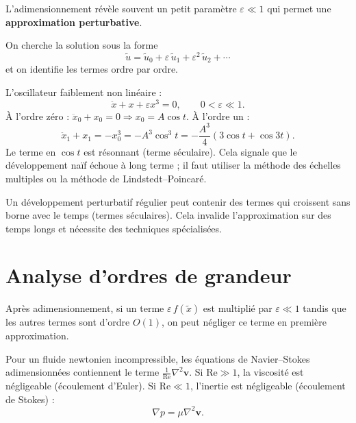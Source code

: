 L'adimensionnement r\'ev\`ele souvent un petit param\`etre $\varepsilon\ll 1$
qui permet une \textbf{approximation perturbative}.

\begin{definition}
On cherche la solution sous la forme
\[
  \tilde{u} = \tilde{u}_0 + \varepsilon\,\tilde{u}_1
             + \varepsilon^2\,\tilde{u}_2 + \cdots
\]
et on identifie les termes ordre par ordre.
\end{definition}

\begin{exemple}
L'oscillateur faiblement non lin\'eaire :
\[
  \ddot{x} + x + \varepsilon x^3 = 0, \qquad 0<\varepsilon\ll 1.
\]
\`A l'ordre z\'ero : $\ddot{x}_0 + x_0 = 0 \Rightarrow x_0 = A\cos t$.
\`A l'ordre un :
\[
  \ddot{x}_1 + x_1 = -x_0^3 = -A^3\cos^3 t
  = -\frac{A^3}{4}(3\cos t + \cos 3t).
\]
Le terme en $\cos t$ est r\'esonnant (terme s\'eculaire).  Cela
signale que le d\'eveloppement na\"if \'echoue \`a long terme ; il
faut utiliser la m\'ethode des \'echelles multiples ou la m\'ethode
de Lindstedt--Poincar\'e.
\end{exemple}

\begin{attention}[title=\textbf{Termes s\'eculaires}]
Un d\'eveloppement perturbatif r\'egulier peut contenir des termes
qui croissent sans borne avec le temps (termes s\'eculaires).  Cela
invalide l'approximation sur des temps longs et n\'ecessite des
techniques sp\'ecialis\'ees.
\end{attention}

\section{Analyse d'ordres de grandeur}

\begin{proposition}
Apr\`es adimensionnement, si un terme $\varepsilon\,f(\tilde{x})$
est multipli\'e par $\varepsilon\ll 1$ tandis que les autres termes
sont d'ordre $O(1)$, on peut n\'egliger ce terme en premi\`ere
approximation.
\end{proposition}

\begin{exemple}
Pour un fluide newtonien incompressible, les \'equations de
Navier--Stokes adimensionn\'ees contiennent le terme
$\frac{1}{\mathrm{Re}}\nabla^2\mathbf{v}$.  Si $\mathrm{Re}\gg 1$,
la viscosit\'e est n\'egligeable (\'ecoulement d'Euler).  Si
$\mathrm{Re}\ll 1$, l'inertie est n\'egligeable (\'ecoulement de
Stokes) :
\[
  \nabla p = \mu\nabla^2\mathbf{v}.
\]
\end{exemple}

